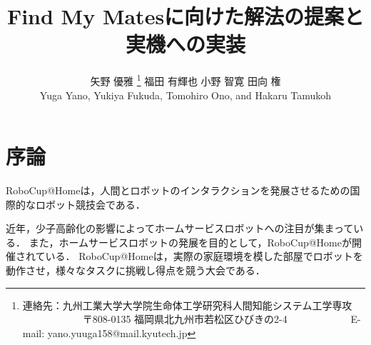 \documentclass[a4j]{jarticle}
\begin{document}
\title{Find My Matesに向けた解法の提案と実機への実装}



\author{矢野 優雅%
	\thanks{連絡先：九州工業大学大学院生命体工学研究科人間知能システム工学専攻 \newline%
		　　　　　　〒808-0135 福岡県北九州市若松区ひびきの2-4 \newline%
		　　　　　　E-mail: yano.yuuga158@mail.kyutech.jp}\quad%
	福田 有輝也
	小野 智寛
	田向 権\\
	Yuga Yano, Yukiya Fukuda, Tomohiro Ono, and Hakaru Tamukoh}



\maketitle
\thispagestyle{empty}


\section{序論}
RoboCup@Homeは，人間とロボットのインタラクションを発展させるための国際的なロボット競技会である．

近年，少子高齢化の影響によってホームサービスロボットへの注目が集まっている．
また，ホームサービスロボットの発展を目的として，RoboCup@Homeが開催されている．
RoboCup@Homeは，実際の家庭環境を模した部屋でロボットを動作させ，様々なタスクに挑戦し得点を競う大会である．
\end{document}
